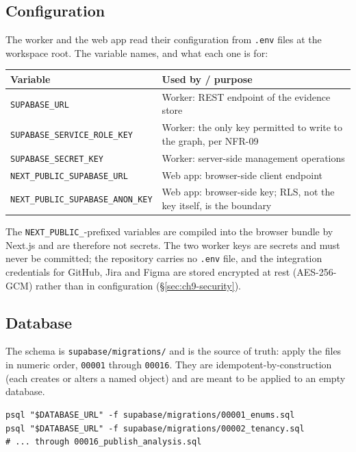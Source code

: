 \subsection{Configuration}

The worker and the web app read their configuration from \texttt{.env} files
at the workspace root. The variable names, and what each one is for:

\begin{longtable}{>{\raggedright\arraybackslash}p{}>{\raggedright\arraybackslash}p{}}
\toprule
\textbf{Variable} & \textbf{Used by / purpose} \\
\midrule
\endhead
\texttt{SUPABASE\_URL} & Worker: REST endpoint of the evidence store \\
\texttt{SUPABASE\_SERVICE\_ROLE\_KEY} & Worker: the only key permitted to
  write to the graph, per NFR-09 \\
\texttt{SUPABASE\_SECRET\_KEY} & Worker: server-side management operations \\
\texttt{NEXT\_PUBLIC\_SUPABASE\_URL} & Web app: browser-side client endpoint \\
\texttt{NEXT\_PUBLIC\_SUPABASE\_ANON\_KEY} & Web app: browser-side key; RLS,
  not the key itself, is the boundary \\
\bottomrule
\end{longtable}

\noindent The \texttt{NEXT\_PUBLIC\_}-prefixed variables are compiled into the
browser bundle by Next.js and are therefore not secrets. The two worker keys
are secrets and must never be committed; the repository carries no
\texttt{.env} file, and the integration credentials for GitHub, Jira and
Figma are stored encrypted at rest (AES-256-GCM) rather than in configuration
(\S\ref{sec:ch9-security}).

\subsection{Database}

The schema is \texttt{supabase/migrations/} and is the source of truth: apply
the files in numeric order, \texttt{00001} through \texttt{00016}. They are
idempotent-by-construction (each creates or alters a named object) and are
meant to be applied to an empty database.

\begin{verbatim}
psql "$DATABASE_URL" -f supabase/migrations/00001_enums.sql
psql "$DATABASE_URL" -f supabase/migrations/00002_tenancy.sql
# ... through 00016_publish_analysis.sql
\end{verbatim}

